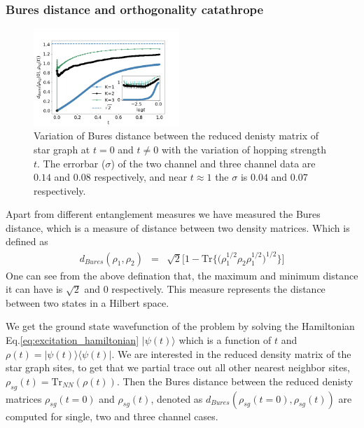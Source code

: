 \documentclass[reprint,prb,superscriptaddress]{revtex4-2}
\begin{document}
\subsubsection{Bures distance and orthogonality catathrope}
\begin{figure}[!htpb]
\includegraphics[width=0.49\textwidth]{plt/error_Bures_Distance_Ch123_10001}
\caption{Variation of Bures distance between the reduced denisty matrix of star graph at $t=0$ and $t\neq 0$ with the variation of hopping  strength $t$. The errorbar ($\sigma$) of the two channel and three channel data are $0.14$ and $0.08$ respectively, and near $t\approx 1$ the $\sigma$ is $0.04$ and $0.07$ respectively.}
\label{fig:bures_distance}
\end{figure}
\noindent Apart from different entanglement measures we have measured the Bures distance, which is a measure of distance between two density matrices. Which is defined as 
\begin{eqnarray}
d_{Bures}(\rho_1,\rho_2) &=& \sqrt{2} \bigg[1- \textrm{Tr}\bigg\{ \bigg(\rho_1^{1/2}  \rho_2 \rho_{1}^{1/2}\bigg)^{1/2} \bigg\}\bigg]
\end{eqnarray}
One can see from the above defination that, the maximum and minimum distance it can have is $\sqrt{2}$ and $0$ respectively. This measure represents the distance between two states in a Hilbert space. 
\par We get the ground state wavefunction of the problem by solving the Hamiltonian Eq.\eqref{eq:excitation_hamiltonian} $|\psi(t)\rangle$ which is a function of $t$ and $\rho(t)= |\psi(t)\rangle \langle \psi(t)|$. We are interested in the reduced density matrix of the star graph sites, to get that we partial trace out all other nearest neighbor sites, $\rho_{sg}(t)=\textrm{Tr}_{NN}(\rho(t))$. Then the Bures distance between the reduced denisty matrices $\rho_{sg}(t=0)$ and $\rho_{sg}(t)$, denoted as $d_{Bures}(\rho_{sg}(t=0),\rho_{sg}(t))$ are computed for single, two and three channel cases.
\end{document}
